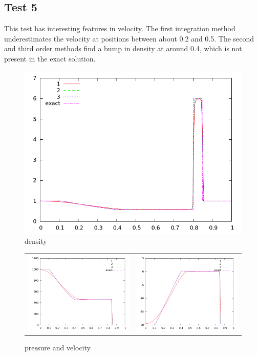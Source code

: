 \documentclass[10pt,preprint]{aastex}
\begin{document}
\clearpage

\subsection{Test 5}
This test has interesting features in velocity. The first integration method underestimates the velocity at positions between about 0.2 and 0.5. The second and third order methods find a bump in density at around 0.4, which is not present in the exact solution.

\begin{figure}[h]
  \begin{center}
     \includegraphics[width=.78\textwidth]{den_T5.png}	
  \end{center}
  \caption{density}
\end{figure}

\begin{figure}
  \begin{center}
	\begin{tabular}{cc}
      \includegraphics[width=.425\textwidth]{prs_T5.png} &
	  \includegraphics[width=.425\textwidth]{vel_T5.png}
	\end{tabular}
  \end{center}
  \caption{pressure and velocity}
\end{figure}
\clearpage
\end{document}
